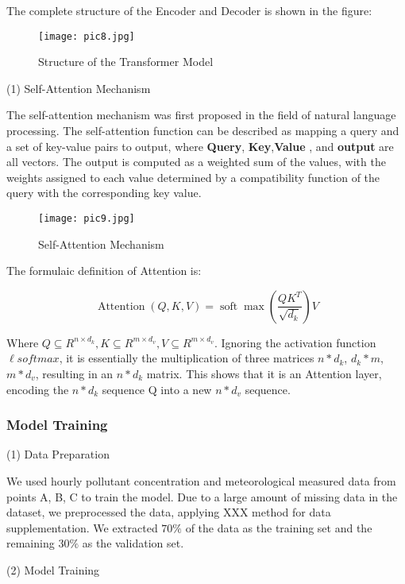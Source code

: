 \documentclass[12pt]{article}
\begin{document}
The complete structure of the Encoder and Decoder is shown in the figure:
\begin{figure}[H]
	\caption{Structure of the Transformer Model}
	\label{pic8}
	\centering
	\texttt{[image: pic8.jpg]}
\end{figure}

(1) Self-Attention Mechanism

The self-attention mechanism was first proposed in the field of natural language processing. The self-attention function can be described as mapping a query and a set of key-value pairs to output, where \textbf{Query}, \textbf{Key},\textbf{Value} , and \textbf{output} are all vectors. The output is computed as a weighted sum of the values, with the weights assigned to each value determined by a compatibility function of the query with the corresponding key value.

\begin{figure}[H]
	\caption{Self-Attention Mechanism}
	\label{pic9}
	\centering
	\texttt{[image: pic9.jpg]}
\end{figure}

The formulaic definition of Attention is:

\begin{equation}
	\operatorname{Attention}(Q, K, V)=\operatorname{soft} \max \left(\frac{Q K^T}{\sqrt{d_k}}\right) V
\end{equation}

Where $Q \subseteq R^{n \times d_k}, K \subseteq R^{m \times d_v}, V \subseteq R^{m \times d_v}$. Ignoring the activation function $\ell softmax$, it is essentially the multiplication of three matrices $n*d_k$, $d_k*m$,$m*d_v$, resulting in an $n*d_k$ matrix. This shows that it is an Attention layer, encoding the $n*d_k$ sequence Q into a new $n*d_v$ sequence.

\subsubsection{ Model Training}

(1) Data Preparation

We used hourly pollutant concentration and meteorological measured data from points A, B, C to train the model. Due to a large amount of missing data in the dataset, we preprocessed the data, applying XXX method for data supplementation. We extracted $70\%$ of the data as the training set and the remaining $30\%$ as the validation set.

(2) Model Training
\end{document}
